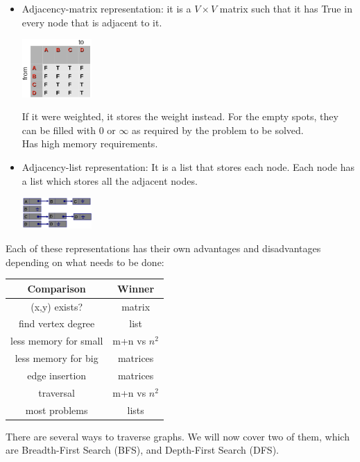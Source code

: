 \documentclass[nobib]{tufte-handout}
\begin{document}
\begin{itemize}
    \item Adjacency-matrix representation: it is a $V\times V$ matrix such that it has True in every node that is adjacent to it.\\
    \begin{center}
        \includegraphics[width = 100px]{images/adj_matrix.png}
    \end{center}
    If it were weighted, it stores the weight instead. For the empty spots, they can be filled with $0$ or $\infty$ as required by the problem to be solved.\\
    Has high memory requirements.
    \item Adjacency-list representation: It is a list that stores each node. Each node has a list which stores all the adjacent nodes.\\
    \begin{center}
        \includegraphics[width = 100px]{images/adj_ist.png}
    \end{center}
\end{itemize}
Each of these representations has their own advantages and disadvantages depending on what needs to be done:
\begin{table}
    \centering
    \begin{tabular}{|c|c|}
        \hline
        Comparison & Winner\\
        \hline
        (x,y) exists? & matrix\\
        find vertex degree & list\\
        less memory for small & m+n vs $n^2$\\
        less memory for big  & matrices\\
        edge insertion & matrices\\
        traversal & m+n vs $n^2$\\
        most problems & lists\\
        \hline
    \end{tabular}
\end{table}
There are several ways to traverse graphs. We will now cover two of them, which are Breadth-First Search (BFS), and Depth-First Search (DFS).\\
\end{document}
